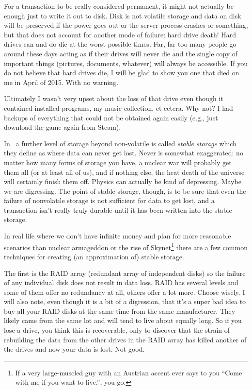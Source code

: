 For a transaction to be really considered permanent, it might not actually be enough just to write it out to disk. Disk is not volatile storage and data on disk will be preserved if the power goes out or the server process crashes or something, but that does not account for another mode of failure: hard drive death! Hard drives can and do die at the worst possible times. Far, far too many people go around these days acting as if their drives will never die and the single copy of important things (pictures, documents, whatever) will always be accessible. If you do not believe that hard drives die, I will be glad to show you one that died on me in April of 2015. With no warning.

Ultimately I wasn't very upset about the loss of that drive even though it contained installed programs, my music collection, et cetera. Why not? I had backups of everything that could not be obtained again easily (e.g., just download the game again from Steam).  

In~\cite{dsc} a further level of storage beyond non-volatile is called \textit{stable storage} which they define as where data can never get lost. Never is somewhat exaggerated: no matter how many forms of storage you have, a nuclear war will probably get them all (or at least all of us), and if nothing else, the heat death of the universe will certainly finish them off. Physics can actually be kind of depressing. Maybe we are digressing. The point of stable storage, though, is to be sure that even the failure of nonvolatile storage is not sufficient for data to get lost, and a transaction isn't really truly durable until it has been written into the stable storage.

In real life where we don't have infinite money and plan for more reasonable scenarios than nuclear armageddon or the rise of Skynet\footnote{If a very large-muscled guy with an Austrian accent ever says to you ``Come with me if you want to live.'', you go.} there are a few common techniques for creating (an approximation of) stable storage. 

The first is the RAID array (redundant array of independent disks) so the failure of any individual disk does not result in data loss. RAID has several levels and some of them offer no redundancy at all, others offer a lot more. Choose wisely. I will also note, even though it is a bit of a digression, that it's a super bad idea to buy all your RAID disks at the same time from the same manufacturer. They likely came from the same lot and will tend to live about equally long. So if you lose a drive, you think this is recoverable, only to discover that the strain of rebuilding the data from the other drives in the RAID array has killed another of the drives and now your data is lost. Not good.

